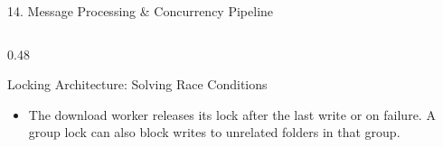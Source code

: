 \documentclass[t, aspectratio=169]{beamer}
\begin{document}
\begin{frame}{14. Message Processing \& Concurrency Pipeline}
\begin{columns}[T]
\begin{column}{0.48\textwidth}
\begin{block}{Locking Architecture: Solving Race Conditions}
\vspace{2pt}
\begin{itemize}
    \tiny
    \item The download worker releases its lock after the last write or on failure. A group lock can also block writes to unrelated folders in that group.
\end{itemize}
\end{block}
\end{column}
\end{columns}
\end{frame}

\end{document}
